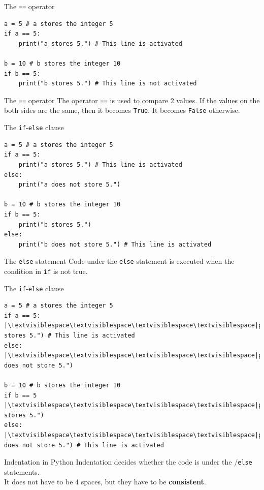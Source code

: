 \documentclass[dvipsnames, svgnames, x11names, handout]{beamer}
\begin{document}
\begin{frame}[fragile]{The \texttt{==} operator}
\begin{verbatim}
a = 5 # a stores the integer 5
if a == 5:
	print("a stores 5.") # This line is activated
	
b = 10 # b stores the integer 10
if b == 5:
	print("b stores 5.") # This line is not activated
\end{verbatim}
\begin{block}{The \texttt{==} operator}
The operator \texttt{==} is used to compare 2 values. If the values on the both sides are the same, then it becomes {\color{blue}\texttt{True}}. It becomes {\color{blue}\texttt{False}} otherwise.
\end{block}
\end{frame}

\begin{frame}[fragile]{The \texttt{if}-\texttt{else} clause}
\begin{verbatim}
a = 5 # a stores the integer 5
if a == 5:
	print("a stores 5.") # This line is activated
else:
	print("a does not store 5.") 
	
b = 10 # b stores the integer 10
if b == 5:
	print("b stores 5.")
else:
	print("b does not store 5.") # This line is activated
\end{verbatim}
\begin{block}{The \texttt{else} statement}
Code under the \texttt{else} statement is executed when the condition in \texttt{if} is not true.
\end{block}
\end{frame}

\begin{frame}[fragile]{The \texttt{if}-\texttt{else} clause}
\begin{verbatim}
a = 5 # a stores the integer 5
if a == 5:
|\textvisiblespace\textvisiblespace\textvisiblespace\textvisiblespace|print("a stores 5.") # This line is activated
else:
|\textvisiblespace\textvisiblespace\textvisiblespace\textvisiblespace|print("a does not store 5.") 
	
b = 10 # b stores the integer 10
if b == 5
|\textvisiblespace\textvisiblespace\textvisiblespace\textvisiblespace|print("b stores 5.")
else:
|\textvisiblespace\textvisiblespace\textvisiblespace\textvisiblespace|print("b does not store 5.") # This line is activated
\end{verbatim}
\begin{block}{Indentation in Python}
Indentation decides whether the code is under the /\texttt{else} statements.\\
It does not have to be 4 spaces, but they have to be \textbf{consistent}.
\end{block}
\end{frame}
\end{document}
